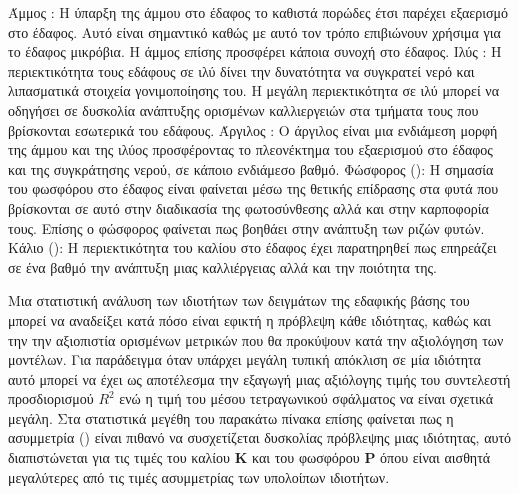 \begin{outline}
        \2 Άμμος : Η ύπαρξη της άμμου στο έδαφος το καθιστά πορώδες έτσι παρέχει εξαερισμό στο έδαφος. Αυτό είναι σημαντικό καθώς με αυτό τον τρόπο επιβιώνουν χρήσιμα για το έδαφος μικρόβια. Η άμμος επίσης προσφέρει κάποια συνοχή στο έδαφος.
        \2 Ιλύς : Η περιεκτικότητα τους εδάφους σε ιλύ δίνει την δυνατότητα να συγκρατεί νερό και λιπασματικά στοιχεία γονιμοποίησης του. Η μεγάλη περιεκτικότητα σε ιλύ μπορεί να οδηγήσει σε δυσκολία ανάπτυξης ορισμένων καλλιεργειών στα τμήματα τους που βρίσκονται εσωτερικά του εδάφους.
        \2 Άργιλος : Ο άργιλος είναι μια ενδιάμεση μορφή της άμμου και της ιλύος προσφέροντας το πλεονέκτημα του εξαερισμού στο έδαφος και της συγκράτησης νερού, σε κάποιο ενδιάμεσο βαθμό.
    \1 Φώσφορος (): Η σημασία του φωσφόρου στο έδαφος είναι φαίνεται μέσω της θετικής επίδρασης στα φυτά που βρίσκονται σε αυτό στην διαδικασία της φωτοσύνθεσης αλλά και στην καρποφορία τους. Επίσης ο φώσφορος φαίνεται πως βοηθάει στην ανάπτυξη των ριζών φυτών.
    \1 Κάλιο (): Η περιεκτικότητα του καλίου στο έδαφος έχει παρατηρηθεί πως επηρεάζει σε ένα βαθμό την ανάπτυξη μιας καλλιέργειας αλλά και την ποιότητα της.
\end{outline}
Μια στατιστική ανάλυση των ιδιοτήτων των δειγμάτων της εδαφικής βάσης του  μπορεί να αναδείξει κατά πόσο είναι εφικτή η πρόβλεψη κάθε ιδιότητας, καθώς και την την αξιοπιστία ορισμένων μετρικών που θα προκύψουν κατά την αξιολόγηση των μοντέλων. Για παράδειγμα όταν υπάρχει μεγάλη τυπική απόκλιση σε μία ιδιότητα αυτό μπορεί να έχει ως αποτέλεσμα την εξαγωγή μιας αξιόλογης τιμής του συντελεστή προσδιορισμού $R^2$ ενώ η τιμή του μέσου τετραγωνικού σφάλματος να είναι σχετικά μεγάλη. Στα στατιστικά μεγέθη του παρακάτω πίνακα επίσης φαίνεται πως η ασυμμετρία () είναι πιθανό να συσχετίζεται δυσκολίας πρόβλεψης μιας ιδιότητας, αυτό διαπιστώνεται για τις τιμές του καλίου $\mathbf{K}$ και του φωσφόρου $\mathbf{P}$ όπου είναι αισθητά μεγαλύτερες από τις τιμές ασυμμετρίας των υπολοίπων ιδιοτήτων. \\

